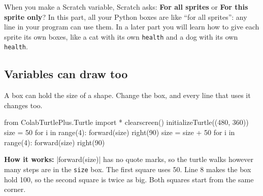 \begin{think}
When you make a Scratch variable, Scratch asks: \textbf{For all sprites} or \textbf{For this sprite only}? In this part, all your Python boxes are like ``for all sprites'': any line in your program can use them. In a later part you will learn how to give each sprite its own boxes, like a cat with its own \texttt{health} and a dog with its own \texttt{health}.
\end{think}

\subsection*{Variables can draw too}

A box can hold the size of a shape. Change the box, and every line that uses it changes too.

\noindent\begin{minipage}[t]{0.33\linewidth}\vspace{0pt}
\begin{scratch}
\end{scratch}
\end{minipage}\hfill\begin{minipage}[t]{0.66\linewidth}\vspace{0pt}
\begin{code}
from ColabTurtlePlus.Turtle import *
clearscreen()
initializeTurtle((480, 360))
size = 50
for i in range(4):
    forward(size)
    right(90)
size = size + 50
for i in range(4):
    forward(size)
    right(90)
\end{code}
\end{minipage}

\textbf{How it works:} \py|forward(size)| has no quote marks, so the turtle walks however many steps are in the \texttt{size} box. The first square uses 50. Line 8 makes the box hold 100, so the second square is twice as big. Both squares start from the same corner.

